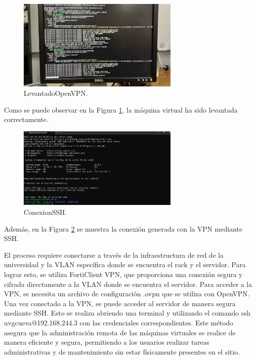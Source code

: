\begin{figure}[H]
    \centering
    \includegraphics[width=0.7\textwidth]{figuras/LevantadoOpenVPN.png}
    \caption{LevantadoOpenVPN.}
    \label{fig:LevantadoOpenVPN}
\end{figure}
Como se puede observar en la Figura \ref{fig:LevantadoOpenVPN}, la máquina virtual ha sido levantada correctamente.

\begin{figure}[H]
    \centering
    \includegraphics[width=0.7\textwidth]{figuras/ConexionSSH.png}
    \caption{ConexionSSH.}
    \label{fig:ConexionSSH}
\end{figure}
Además, en la Figura \ref{fig:ConexionSSH} se muestra la conexión generada con la VPN mediante SSH.


El proceso requiere conectarse a través de la infraestructura de red de la universidad y la VLAN específica donde se encuentra el rack y el servidor. Para lograr esto, se utiliza FortiClient VPN, que proporciona una conexión segura y cifrada directamente a la VLAN donde se encuentra el servidor. Para acceder a la VPN, se necesita un archivo de configuración .ovpn que se utiliza con OpenVPN. Una vez conectado a la VPN, se puede acceder al servidor de manera segura mediante SSH. Esto se realiza abriendo una terminal y utilizando el comando ssh uvgcueva@192.168.244.3 con las credenciales correspondientes. Este método asegura que la administración remota de las máquinas virtuales se realice de manera eficiente y segura, permitiendo a los usuarios realizar tareas administrativas y de mantenimiento sin estar físicamente presentes en el sitio.

